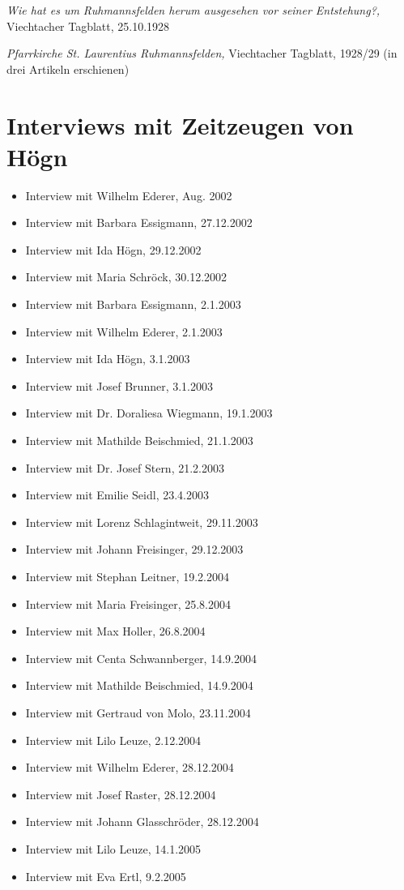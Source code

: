 \textit{Wie hat es um Ruhmannsfelden herum ausgesehen vor seiner
Entstehung?,} Viechtacher Tagblatt, 25.10.1928

\textit{Pfarrkirche St. Laurentius Ruhmannsfelden,} Viechtacher
Tagblatt, 1928/29 (in drei Artikeln erschienen)

\section{Interviews mit Zeitzeugen von Högn}

\begin{itemize}
\item Interview mit Wilhelm Ederer, Aug. 2002
\item Interview mit Barbara Essigmann, 27.12.2002
\item Interview mit Ida Högn, 29.12.2002
\item Interview mit Maria Schröck, 30.12.2002
\item Interview mit Barbara Essigmann, 2.1.2003
\item Interview mit Wilhelm Ederer, 2.1.2003
\item Interview mit Ida Högn, 3.1.2003
\item Interview mit Josef Brunner, 3.1.2003
\item Interview mit Dr. Doraliesa Wiegmann, 19.1.2003
\item Interview mit Mathilde Beischmied, 21.1.2003
\item Interview mit Dr. Josef Stern, 21.2.2003
\item Interview mit Emilie Seidl, 23.4.2003
\item Interview mit Lorenz Schlagintweit, 29.11.2003
\item Interview mit Johann Freisinger, 29.12.2003
\item Interview mit Stephan Leitner, 19.2.2004
\item Interview mit Maria Freisinger, 25.8.2004
\item Interview mit Max Holler, 26.8.2004
\item Interview mit Centa Schwannberger, 14.9.2004
\item Interview mit Mathilde Beischmied, 14.9.2004
\item Interview mit Gertraud von Molo, 23.11.2004
\item Interview mit Lilo Leuze, 2.12.2004
\item Interview mit Wilhelm Ederer, 28.12.2004
\item Interview mit Josef Raster, 28.12.2004
\item Interview mit Johann Glasschröder, 28.12.2004
\item Interview mit Lilo Leuze, 14.1.2005
\item Interview mit Eva Ertl, 9.2.2005
\end{itemize}

